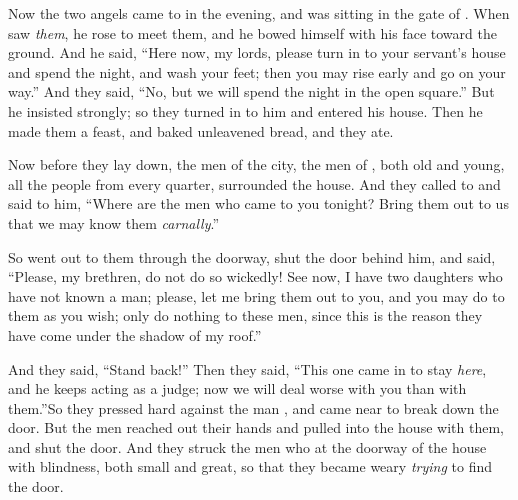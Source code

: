 
\bverse Now the two angels came to  in the evening, and  was sitting in the gate of . When  saw \textit{them}, he rose to meet them, and he bowed himself with his face toward the ground.
\bverse And he said, ``Here now, my lords, please turn in to your servant's house and spend the night, and wash your feet; then you may rise early and go on your way.'' And they said, ``No, but we will spend the night in the open square.''
\bverse But he insisted strongly; so they turned in to him and entered his house. Then he made them a feast, and baked unleavened bread, and they ate.

\bverse Now before they lay down, the men of the city, the men of , both old and young, all the people from every quarter, surrounded the house.
\bverse And they called to  and said to him, ``Where are the men who came to you tonight? Bring them out to us that we may know them \textit{carnally}.''

\bverse So  went out to them through the doorway, shut the door behind him, 
\bverse and said, ``Please, my brethren, do not do so wickedly! 
\bverse See now, I have two daughters who have not known a man; please, let me bring them out to you, and you may do to them as you wish; only do nothing to these men, since this is the reason they have come under the shadow of my roof.''

\bverse And they said, ``Stand back!'' Then they said, ``This one came in to stay \textit{here}, and he keeps acting as a judge; now we will deal worse with you than with them.''So they pressed hard against the man , and came near to break down the door.
\bverse But the men reached out their hands and pulled  into the house with them, and shut the door.
\bverse And they struck the men who \were at the doorway of the house with blindness, both small and great, so that they became weary \textit{trying} to find the door.


\bverse 
\bverse 
\bverse 
\bverse 
\bverse 
\bverse 
\bverse 
\bverse 
\bverse 
\bverse 
\bverse 
\bverse 
\bverse 
\bverse 
\bverse 
\bverse 
\bverse 
\bverse 
\bverse 
\bverse 
\bverse 
\bverse 
\bverse 
\bverse 
\bverse 
\bverse 
\bverse 
